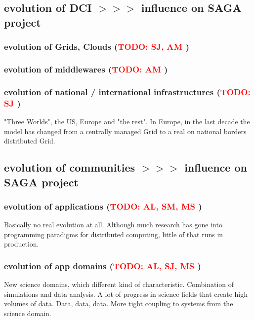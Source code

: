 \documentclass[]{article}
\newcommand{\B}[1]{\textbf{#1}}
\newcommand{\nind}{\noindent}
\newcommand{\todo}[1]{{\textcolor{red}{\B{TODO:} #1 }}}
\begin{document}

 \subsection{ evolution of DCI $>>>$ influence on SAGA project}
 \subsubsection{ evolution of Grids, Clouds (\todo{SJ, AM})}
 \subsubsection{ evolution of middlewares (\todo{AM})}
 \subsubsection{ evolution of national / international infrastructures (\todo{SJ})}

 "Three Worlds", the US, Europe and "the rest".  In Europe, in the
 last decade the model has changed from a centrally managed Grid to a
 real on national borders distributed Grid.\\

 
 \nind
 \subsection{ evolution of communities  $>>>$ influence on SAGA project}
 \subsubsection{ evolution of applications (\todo{AL, SM, MS})}
 
 Basically no real evolution at all. Although much research has gone
 into programming paradigms for distributed computing, little of that
 runs in production.
 
 \subsubsection{ evolution of app domains (\todo{AL, SJ, MS})}
 
 New science domains, which different kind of characteristic.
 Combination of simulations and data analysis. A lot of progress in
 science fields that create high volumes of data.  Data, data, data.
 More tight coupling to systems from the science domain.
 
\end{document}
